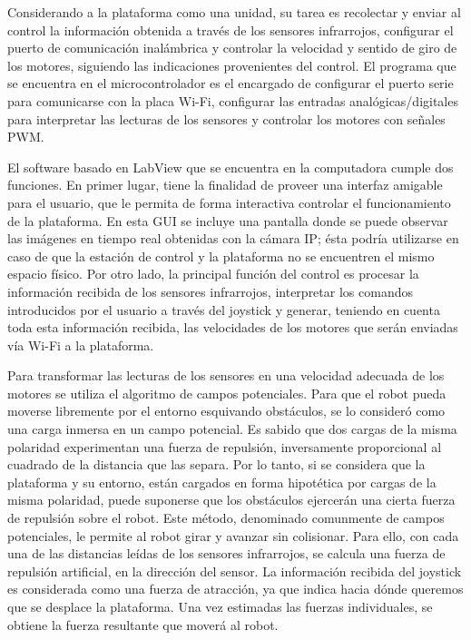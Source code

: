 \documentclass[conference,a4paper,9pt]{IEEEtran}
\begin{document}
Considerando a la plataforma como una unidad, su tarea es recolectar y enviar al control la información obtenida a través de los sensores infrarrojos, configurar el puerto de comunicación inalámbrica y controlar la velocidad y sentido de giro de los motores, siguiendo las indicaciones provenientes del control. El programa que se encuentra en el microcontrolador es el encargado de configurar el puerto serie para comunicarse con la placa Wi-Fi, configurar las entradas analógicas/digitales para interpretar las lecturas de los sensores y controlar los motores con señales PWM.

El software basado en LabView que se encuentra en la computadora cumple dos funciones. En primer lugar, tiene la finalidad de proveer una interfaz amigable para el usuario, que le permita de forma interactiva controlar el funcionamiento de la plataforma. En esta GUI se incluye una pantalla donde se puede observar las imágenes en tiempo real obtenidas con la cámara IP; ésta podría utilizarse en caso de que la estación de control y la plataforma no se encuentren el mismo espacio físico. Por otro lado, la principal función del control es procesar la información recibida de los sensores infrarrojos, interpretar los comandos introducidos por el usuario a través del joystick y generar, teniendo en cuenta toda esta información recibida, las velocidades de los motores que serán enviadas vía Wi-Fi a la plataforma.

Para transformar las lecturas de los sensores en una velocidad adecuada de los motores se utiliza el algoritmo de campos potenciales. Para que el robot pueda moverse libremente por el entorno esquivando obstáculos, se lo consideró como una carga inmersa en un campo potencial. Es sabido que dos cargas de la misma polaridad experimentan una fuerza de repulsión, inversamente proporcional al cuadrado de la distancia que las separa. Por lo tanto, si se considera que la plataforma y su entorno, están cargados en forma hipotética por cargas de la misma polaridad, puede suponerse que los obstáculos ejercerán una cierta fuerza de repulsión sobre el robot. Este método, denominado comunmente de campos potenciales, le permite al robot girar y avanzar sin colisionar. Para ello, con cada una de las distancias leídas de los sensores infrarrojos, se calcula una fuerza de repulsión artificial, en la dirección del sensor. La información recibida del joystick es considerada como una fuerza de atracción, ya que indica hacia dónde queremos que se desplace la plataforma. Una vez estimadas las fuerzas individuales, se obtiene la
fuerza resultante que moverá al robot.
\end{document}
